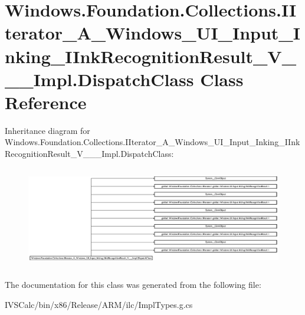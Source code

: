 \hypertarget{class_windows_1_1_foundation_1_1_collections_1_1_i_iterator___a___windows___u_i___input___inking4465da22896ba42ec3642bfaa960c717}{}\section{Windows.\+Foundation.\+Collections.\+I\+Iterator\+\_\+\+A\+\_\+\+Windows\+\_\+\+U\+I\+\_\+\+Input\+\_\+\+Inking\+\_\+\+I\+Ink\+Recognition\+Result\+\_\+\+V\+\_\+\+\_\+\+\_\+\+Impl.\+Dispatch\+Class Class Reference}
\label{class_windows_1_1_foundation_1_1_collections_1_1_i_iterator___a___windows___u_i___input___inking4465da22896ba42ec3642bfaa960c717}
Inheritance diagram for Windows.\+Foundation.\+Collections.\+I\+Iterator\+\_\+\+A\+\_\+\+Windows\+\_\+\+U\+I\+\_\+\+Input\+\_\+\+Inking\+\_\+\+I\+Ink\+Recognition\+Result\+\_\+\+V\+\_\+\+\_\+\+\_\+\+Impl.\+Dispatch\+Class\+:\begin{figure}[H]
\begin{center}
\leavevmode
\includegraphics[height=4.502924cm]{class_windows_1_1_foundation_1_1_collections_1_1_i_iterator___a___windows___u_i___input___inking4465da22896ba42ec3642bfaa960c717}
\end{center}
\end{figure}


The documentation for this class was generated from the following file\+:\begin{DoxyCompactItemize}
\item 
I\+V\+S\+Calc/bin/x86/\+Release/\+A\+R\+M/ilc/Impl\+Types.\+g.\+cs\end{DoxyCompactItemize}
